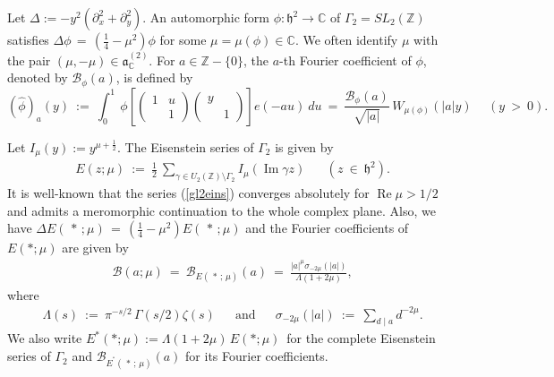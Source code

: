 \documentclass[11pt,reqno]{amsart}
\theoremstyle{definition}
\theoremstyle{definition}
\theoremstyle{remark}
\newcommand{\C}{\ensuremath{\mathbb{C}}}
\newcommand{\Z}{\ensuremath{\mathbb{Z}}}
\numberwithin{equation}{section}
\DeclareMathOperator{\re}{Re}
\DeclareMathOperator{\im}{Im}
\begin{document}
Let $\Delta:= -y^2\left( \partial_{x}^2 +\partial_{y}^2\right)$. An automorphic form  $\phi:  \mathfrak{h}^2 \rightarrow \C$ of $\Gamma_{2}=SL_{2}(\Z)$ satisfies  $\Delta\phi \,= \, \left( \frac{1}{4} -\mu^2\right) \phi$ for some $\mu= \mu(\phi) \in \C$. We often identify $\mu$ with the pair $(\mu, -\mu)\in \mathfrak{a}_{\C}^{(2)}$. For $a\in \Z-\{0 \}$, the $a$-th Fourier coefficient of $\phi$, denoted by $\mathcal{B}_{\phi}(a)$, is defined  by
\begin{equation}\label{eiscuspcoeff}
(\widehat{\phi})_{a}(y) \ := \  \int_{0}^{1} \ \phi\left[ \begin{pmatrix}
1 & u\\
& 1
\end{pmatrix} \begin{pmatrix}
y & \\
& 1
\end{pmatrix}\right] e(-au) \ du \ = \  \frac{\mathcal{B}_{\phi}(a)}{\sqrt{|a|}} \,  W_{\mu(\phi)}(|a|y) \hspace{15pt} (y\ > \ 0).
\end{equation}

Let   $I_{\mu}(y):= y^{\mu+\frac{1}{2}}$. The Eisenstein series of $\Gamma_{2}$ is given by
		\begin{align}\label{gl2eins}
		E(z; \mu) \ := \  \frac{1}{2} \  \sum_{\gamma\in U_{2}(\Z)\setminus\Gamma_{2}} I_{\mu}(\im \gamma z) \hspace{20pt} (z \ \in \  \mathfrak{h}^2).
		\end{align}
	It is well-known that the series (\ref{gl2eins}) converges absolutely for  $\re \mu>1/2$  and admits a meromorphic continuation to the whole complex plane.  Also, we have $\Delta E(\, *\, ;  \mu) \,  = \,  \left( \frac{1}{4}-\mu^2\right) E(\, *\, ;  \mu)$ and  the Fourier coefficients  of $E(*;\mu)$ are given by  
		\begin{align}\label{eisfournorm}
		\mathcal{B}(a;\mu) \ = \  \mathcal{B}_{E(\, * \, ; \, \mu)}(a)    \ = \  \frac{|a|^{\mu}\sigma_{-2\mu}(|a|)}{\Lambda(1+2\mu)}, 
		\end{align}	  
		where
		\begin{align*}
			\Lambda(s) \ := \  \pi^{-s/2}\, \Gamma(s/2)\zeta(s) \hspace{15pt} \text{ and } \hspace{15pt}  \sigma_{-2\mu}(|a|) \ := \  \sum_{d \mid a} d^{-2\mu}.  
		\end{align*}
		 We also write $E^{*}(*;\mu):=\Lambda(1+2\mu)\, E(*;\mu)$\, for the complete Eisenstein series of $\Gamma_{2}$  and    $\mathcal{B}_{E^{^*}(\, * \, ; \, \mu)}(a)$ for its Fourier coefficients.  
\end{document}

